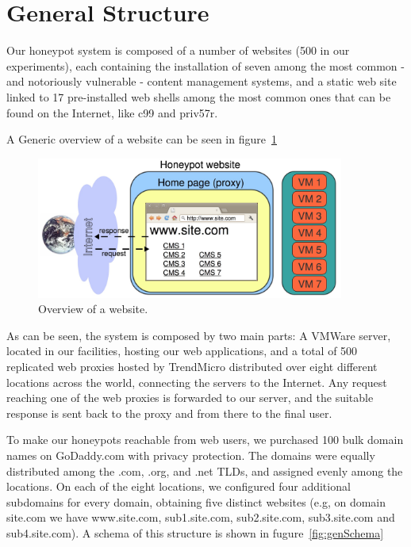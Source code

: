 \section{General Structure}

Our honeypot system is composed of a number of websites (500 in our experiments), each containing the installation of seven among the most common - and notoriously vulnerable - content management systems, and a static web site linked to 17 pre-installed web shells among the most common ones that can be found on the Internet, like c99 and priv57r.

A Generic overview of a website can be seen in figure~\ref{fig:websiteView}

\begin{figure}[tbh]
\centerline{\includegraphics[width=0.9\textwidth]{Images/websiteOverview.png}}
\caption{Overview of a website.\label{fig:websiteView}}
\end{figure}

As can be seen, the system is composed by two main parts: A VMWare server, located in our facilities, hosting our web applications, and a total of 500 replicated web proxies hosted by TrendMicro distributed over eight different locations across the world, connecting the servers to the Internet. Any request reaching one of the web proxies is forwarded to our server, and the suitable response is sent back to the proxy and from there to the final user.

To make our honeypots reachable from web users, we purchased 100 bulk domain names on GoDaddy.com with privacy protection. The domains were equally distributed among the .com, .org, and .net TLDs, and assigned evenly among the locations.
On each of the eight locations, we configured four additional subdomains for every domain, obtaining five distinct websites (e.g, on domain site.com we have www.site.com, sub1.site.com, sub2.site.com, sub3.site.com and sub4.site.com). A schema of this structure is shown in fugure~\ref{fig:genSchema}

